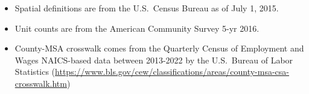 \begin{itemize}
\item Spatial definitions are from the U.S.~Census Bureau as of July 1, 2015.
\item Unit counts are from the American Community Survey 5-yr 2016.
\item County-MSA crosswalk comes from the Quarterly Census of Employment and Wages NAICS-based data between 2013-2022 by the U.S.~Bureau of Labor Statistics (\href{https://www.bls.gov/cew/classifications/areas/county-msa-csa-crosswalk.htm}{https://www.bls.gov/cew/classifications/areas/county-msa-csa-crosswalk.htm})
\end{itemize}
